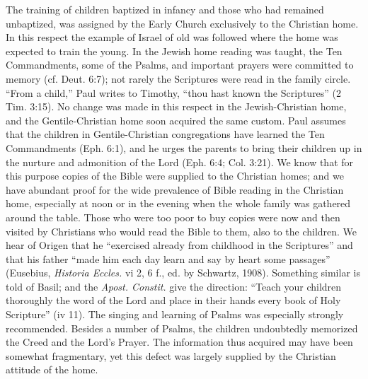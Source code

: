 The training of children baptized in infancy and those who had remained unbaptized, was assigned by the Early Church exclusively to the Christian home. In this respect the example of Israel of old was followed where the home was expected to train the young. In the Jewish home reading was taught, the Ten Commandments, some of the Psalms, and important prayers were committed to memory (cf. Deut. 6:7); not rarely the Scriptures were read in the family circle. “From a child,” Paul writes to Timothy, “thou hast known the Scriptures” (2 Tim. 3:15). No change was made in this respect in the Jewish-Christian home, and the Gentile-Christian home soon acquired the same custom. Paul assumes that the children in Gentile-Christian congregations have learned the Ten Commandments (Eph. 6:1), and he urges the parents to bring their children up in the nurture and admonition of the Lord (Eph. 6:4; Col. 3:21). We know that for this purpose copies of the Bible were supplied to the Christian homes; and we have abundant proof for the wide prevalence of Bible reading in the Christian home, especially at noon or in the evening when the whole family was gathered around the table. Those who were too poor to buy copies were now and then visited by Christians who would read the Bible to them, also to the children. We
hear of Origen that he “exercised already from childhood in the Scriptures” and that his father “made him each day learn and say by heart some passages” (Eusebius, \emph{Historia Eccles.} vi 2, 6 f., ed. by Schwartz, 1908). Something similar is told of Basil; and the \emph{Apost. Constit.} give the direction: “Teach your children thoroughly the word of the Lord and place in their hands every book of Holy Scripture” (iv 11). The singing and learning of Psalms was especially strongly recommended. Besides a number of Psalms, the children undoubtedly memorized the Creed and the Lord’s Prayer. The information thus acquired may have been somewhat fragmentary, yet this defect was largely supplied by the Christian attitude of the home.


